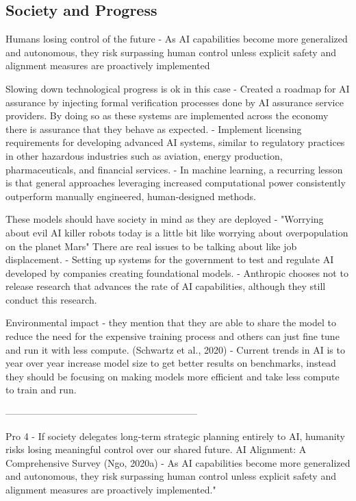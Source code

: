 \subsection{Society and Progress}

Humans losing control of the future
\citep{ngo_agi_2020} - As AI capabilities become more generalized and autonomous, they risk surpassing human control unless explicit safety and alignment measures are proactively implemented


Slowing down technological progress is ok in this case
\citep{government_of_the_united_kingdom_roadmap_2021} - Created a roadmap for AI assurance by injecting formal verification processes done by AI assurance service providers. By doing so as these systems are implemented across the economy there is assurance that they behave as expected.
\citep{anderljung_frontier_2023} - Implement licensing requirements for developing advanced AI systems, similar to regulatory practices in other hazardous industries such as aviation, energy production, pharmaceuticals, and financial services.
\citep{sutton_bitter_2019} - In machine learning, a recurring lesson is that general approaches leveraging increased computational power consistently outperform manually engineered, human-designed methods.


These models should have society in mind as they are deployed
\citep{ng_andrew_2017} - "Worrying about evil AI killer robots today is a little bit like worrying about overpopulation on the planet Mars" There are real issues to be talking about like job displacement.
\citep{the_white_house_fact_2023} - Setting up systems for the government to test and regulate AI developed by companies creating foundational models.
\citep{anthropic_core_2023} - Anthropic chooses not to release research that advances the rate of AI capabilities, although they still conduct this research.


Environmental impact
\citep{touvron_llama_2023} - they mention that they are able to share the model to reduce the need for the expensive training process and others can just fine tune and run it with less compute.
(Schwartz et al., 2020)
\citep{schwartz_green_2019} - Current trends in AI is to year over year increase model size to get better results on benchmarks, instead they should be focusing on making models more efficient and take less compute to train and run.

------------------------------------------------------------

Pro 4 - If society delegates long-term strategic planning entirely to AI, humanity risks losing meaningful control over our shared future.
AI Alignment: A Comprehensive Survey
(Ngo, 2020a)
\citep{ngo_agi_2020} - As AI capabilities become more generalized and autonomous, they risk surpassing human control unless explicit safety and alignment measures are proactively implemented."

